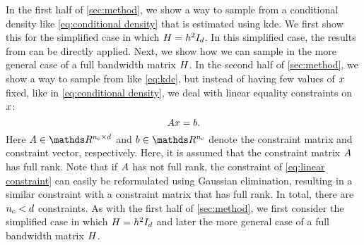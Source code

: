 In the first half of \cref{sec:method}, we show a way to sample from a conditional density like \cref{eq:conditional density} that is estimated using \ac{kde}. 
We first show this for the simplified case in which $H=h^2 I_{d}$. 
In this simplified case, the results from \textcite{hyndman1996estimating, holmes2007fast} can be directly applied.
Next, we show how we can sample in the more general case of a full bandwidth matrix $H$.
In the second half of \cref{sec:method}, we show a way to sample from  like \cref{eq:kde}, but instead of having few values of $x$ fixed, like in \cref{eq:conditional density}, we deal with linear equality constraints on $x$:
\begin{equation}
	\label{eq:linear constraint}
	A x = b.
\end{equation}
Here $\constraintmatrix \in \realnumbers^{\numberofconstraints \times \dimension}$ and $\constraintvector \in \realnumbers^{\numberofconstraints}$ denote the constraint matrix and constraint vector, respectively. 
Here, it is assumed that the constraint matrix $A$ has full rank.
Note that if $A$ has not full rank, the constraint of \cref{eq:linear constraint} can easily be reformulated using Gaussian elimination, resulting in a similar constraint with a constraint matrix that has full rank.
In total, there are $n_\mathrm{c} < d$ constraints.
As with the first half of \cref{sec:method}, we first consider the simplified case in which $H=h^2 I_{d}$ and later the more general case of a full bandwidth matrix $H$.

